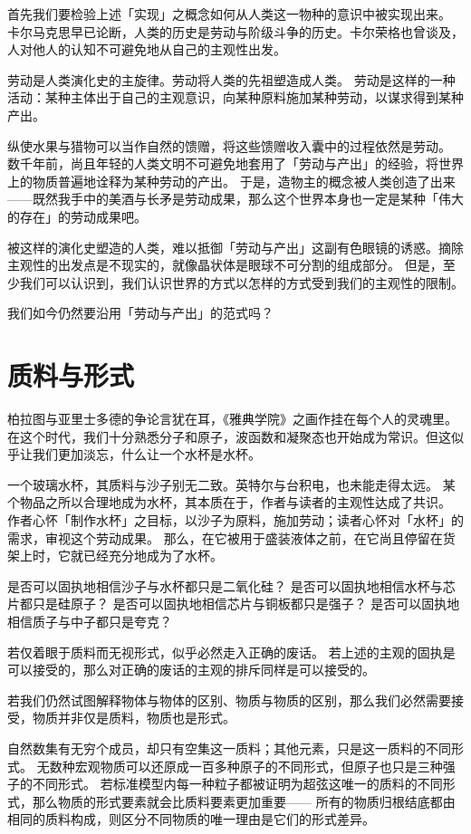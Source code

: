 首先我们要检验上述「实现」之概念如何从人类这一物种的意识中被实现出来。
卡尔马克思早已论断，人类的历史是劳动与阶级斗争的历史。卡尔荣格也曾谈及，人对他人的认知不可避免地从自己的主观性出发。

劳动是人类演化史的主旋律。劳动将人类的先祖塑造成人类。
劳动是这样的一种活动：某种主体出于自己的主观意识，向某种原料施加某种劳动，以谋求得到某种产出。

纵使水果与猎物可以当作自然的馈赠，将这些馈赠收入囊中的过程依然是劳动。
数千年前，尚且年轻的人类文明不可避免地套用了「劳动与产出」的经验，将世界上的物质普遍地诠释为某种劳动的产出。
于是，造物主的概念被人类创造了出来——既然我手中的美酒与长矛是劳动成果，那么这个世界本身也一定是某种「伟大的存在」的劳动成果吧。

被这样的演化史塑造的人类，难以抵御「劳动与产出」这副有色眼镜的诱惑。摘除主观性的出发点是不现实的，就像晶状体是眼球不可分割的组成部分。
但是，至少我们可以认识到，我们认识世界的方式以怎样的方式受到我们的主观性的限制。

我们如今仍然要沿用「劳动与产出」的范式吗？

\section{质料与形式}

柏拉图与亚里士多德的争论言犹在耳，《雅典学院》之画作挂在每个人的灵魂里。
在这个时代，我们十分熟悉分子和原子，波函数和凝聚态也开始成为常识。但这似乎让我们更加淡忘，什么让一个水杯是水杯。

一个玻璃水杯，其质料与沙子别无二致。英特尔与台积电，也未能走得太远。
某个物品之所以合理地成为水杯，其本质在于，作者与读者的主观性达成了共识。
作者心怀「制作水杯」之目标，以沙子为原料，施加劳动；读者心怀对「水杯」的需求，审视这个劳动成果。
那么，在它被用于盛装液体之前，在它尚且停留在货架上时，它就已经充分地成为了水杯。

是否可以固执地相信沙子与水杯都只是二氧化硅？
是否可以固执地相信水杯与芯片都只是硅原子？
是否可以固执地相信芯片与铜板都只是强子？
是否可以固执地相信质子与中子都只是夸克？

若仅着眼于质料而无视形式，似乎必然走入正确的废话。
若上述的主观的固执是可以接受的，那么对正确的废话的主观的排斥同样是可以接受的。

若我们仍然试图解释物体与物体的区别、物质与物质的区别，那么我们必然需要接受，物质并非仅是质料，物质也是形式。

自然数集有无穷个成员，却只有空集这一质料；其他元素，只是这一质料的不同形式。
无数种宏观物质可以还原成一百多种原子的不同形式，但原子也只是三种强子的不同形式。
若标准模型内每一种粒子都被证明为超弦这唯一的质料的不同形式，那么物质的形式要素就会比质料要素更加重要——
所有的物质归根结底都由相同的质料构成，则区分不同物质的唯一理由是它们的形式差异。

